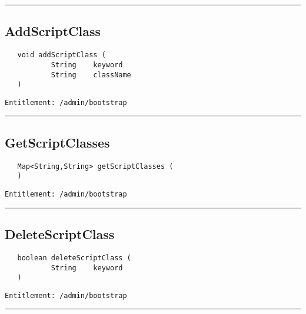 \rule{12cm}{2pt}
\subsection{AddScriptClass}
\label{Api:AddScriptClass}
\begin{Verbatim}
   void addScriptClass (
           String    keyword
           String    className
   )
\end{Verbatim}
\begin{Verbatim}[formatcom=\color{Maroon}]
  Entitlement: /admin/bootstrap
\end{Verbatim}



\rule{12cm}{2pt}
\subsection{GetScriptClasses}
\label{Api:GetScriptClasses}
\begin{Verbatim}
   Map<String,String> getScriptClasses (
   )
\end{Verbatim}
\begin{Verbatim}[formatcom=\color{Maroon}]
  Entitlement: /admin/bootstrap
\end{Verbatim}



\rule{12cm}{2pt}
\subsection{DeleteScriptClass}
\label{Api:DeleteScriptClass}
\begin{Verbatim}
   boolean deleteScriptClass (
           String    keyword
   )
\end{Verbatim}
\begin{Verbatim}[formatcom=\color{Maroon}]
  Entitlement: /admin/bootstrap
\end{Verbatim}



\rule{12cm}{2pt}
